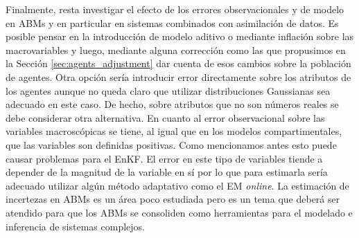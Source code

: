 Finalmente, resta investigar el efecto de los errores observacionales y de modelo en ABMs y en particular en sistemas combinados con asimilación de datos. Es posible pensar en la introducción de modelo aditivo o mediante inflación sobre las macrovariables y luego, mediante alguna corrección como las que propusimos en la Sección \ref{sec:agents_adjustment} dar cuenta de esos cambios sobre la población de agentes. Otra opción sería introducir error directamente sobre los atributos de los agentes aunque no queda claro que utilizar distribuciones Gaussianas sea adecuado en este caso. De hecho, sobre  atributos que no son números reales se debe considerar otra alternativa. En cuanto al error observacional sobre las variables macroscópicas se tiene, al igual que en los modelos compartimentales, que las variables son definidas positivas. Como mencionamos antes esto puede causar problemas para el EnKF. El error en este tipo de variables tiende a depender de la magnitud de la variable en sí por lo que para estimarla sería adecuado utilizar algún método adaptativo como el EM \textit{online}. La estimación de incertezas en ABMs es un área poco estudiada pero es un tema que deberá ser atendido para que los ABMs se consoliden como herramientas para el modelado e inferencia de sistemas complejos.
